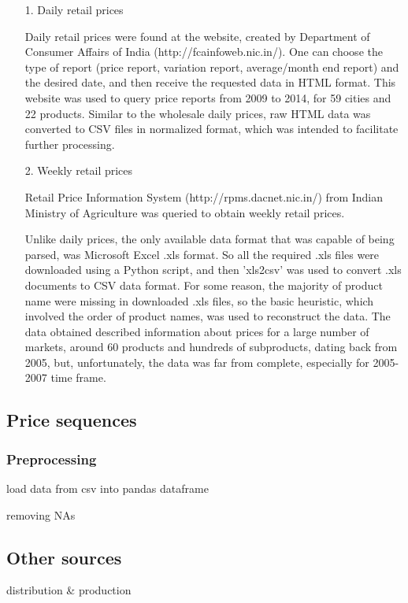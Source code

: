 \begin{itemize}

\item[1.] Daily retail prices

Daily retail prices were found at the website, created by Department of Consumer Affairs of India (http://fcainfoweb.nic.in/). One can choose the type of report (price report, variation report, average/month end report) and the desired date, and then receive the requested data in HTML format. This website was used to query price reports from 2009 to 2014, for 59 cities and 22 products. Similar to the wholesale daily prices, raw HTML data was converted to CSV files in normalized format, which was intended to facilitate further processing.

\item[2.] Weekly retail prices

Retail Price Information System (http://rpms.dacnet.nic.in/) from Indian Ministry of Agriculture was queried to obtain weekly retail prices. 

Unlike daily prices, the only available data format that was capable of being parsed, was Microsoft Excel .xls format. So all the required .xls files were downloaded using a Python script, and then 'xls2csv' was used to convert .xls documents to CSV data format. For some reason, the majority of product name were missing in downloaded .xls files, so the basic heuristic, which involved the order of product names, was used to reconstruct the data.
The data obtained described information about prices for a large number of markets, around 60 products and hundreds of subproducts, dating back from 2005, but, unfortunately, the data was far from complete, especially for 2005-2007 time frame.

\end{itemize}

\subsection*{Price sequences}

\subsubsection*{Preprocessing}
load data from csv into pandas dataframe 

removing NAs


\subsection*{Other sources}
distribution \& production

